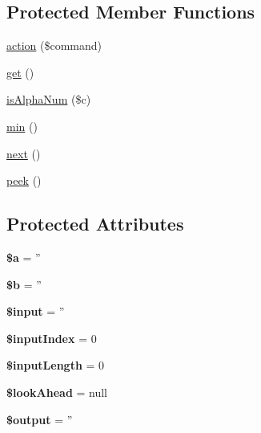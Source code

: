 \subsection*{Protected Member Functions}
\begin{DoxyCompactItemize}
\item 
\hyperlink{classJavascriptMinifier_a0c75407b85df75294ca362f65285df79}{action} (\$command)
\item 
\hyperlink{classJavascriptMinifier_ae7e2ae85b89dcd36f10c8298cc5c8749}{get} ()
\item 
\hyperlink{classJavascriptMinifier_a0a745cbf92ba3dd748b736b1f20abd87}{isAlphaNum} (\$c)
\item 
\hyperlink{classJavascriptMinifier_a67114eb8f254e1765a79ba839e979715}{min} ()
\item 
\hyperlink{classJavascriptMinifier_af6ec11eefc8cd9f0e456fa9d37a8c59d}{next} ()
\item 
\hyperlink{classJavascriptMinifier_a7cb211bf16d3b5cc798d8fed55adff5e}{peek} ()
\end{DoxyCompactItemize}
\subsection*{Protected Attributes}
\begin{DoxyCompactItemize}
\item 
\hypertarget{classJavascriptMinifier_a9f9a71c5c9b9edccbb9bb8b075702168}{
{\bfseries \$a} = ''}
\label{classJavascriptMinifier_a9f9a71c5c9b9edccbb9bb8b075702168}

\item 
\hypertarget{classJavascriptMinifier_a7ea8d31775d6e5215bce5ffb5cbf1b8c}{
{\bfseries \$b} = ''}
\label{classJavascriptMinifier_a7ea8d31775d6e5215bce5ffb5cbf1b8c}

\item 
\hypertarget{classJavascriptMinifier_ab2032dc266550de10145cff54ae261ea}{
{\bfseries \$input} = ''}
\label{classJavascriptMinifier_ab2032dc266550de10145cff54ae261ea}

\item 
\hypertarget{classJavascriptMinifier_a9665490c52f95ea7f6175f34c3a57616}{
{\bfseries \$inputIndex} = 0}
\label{classJavascriptMinifier_a9665490c52f95ea7f6175f34c3a57616}

\item 
\hypertarget{classJavascriptMinifier_a2bd451f9110be5c888d3487e0deb9eaa}{
{\bfseries \$inputLength} = 0}
\label{classJavascriptMinifier_a2bd451f9110be5c888d3487e0deb9eaa}

\item 
\hypertarget{classJavascriptMinifier_a3f8518e009d5c441b26accdff5f4d43d}{
{\bfseries \$lookAhead} = null}
\label{classJavascriptMinifier_a3f8518e009d5c441b26accdff5f4d43d}

\item 
\hypertarget{classJavascriptMinifier_aa9dfe4fadbc72f8da4781d089898fc4e}{
{\bfseries \$output} = ''}
\label{classJavascriptMinifier_aa9dfe4fadbc72f8da4781d089898fc4e}

\end{DoxyCompactItemize}


